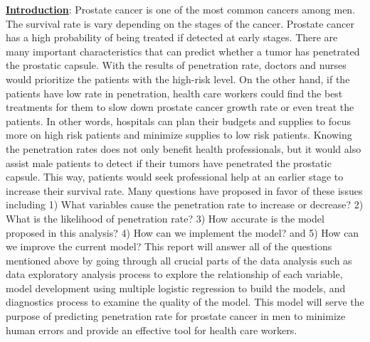 \documentclass[11pt]{article}\usepackage[]{graphicx}\usepackage[]{color}
\begin{document}
\noindent\textbf{\underline{Introduction}}: Prostate cancer is one of the most common cancers among men. The survival rate is vary depending on the stages of the cancer. Prostate cancer has a high probability of being treated if detected at early stages. There are many important characteristics that can predict whether a tumor has penetrated the prostatic capsule. With the results of penetration rate, doctors and nurses would prioritize the patients with the high-risk level. On the other hand, if the patients have low rate in penetration, health care workers could find the best treatments for them to slow down prostate cancer growth rate or even treat the patients. In other words, hospitals can plan their budgets and supplies to focus more on high risk patients and minimize supplies to low risk patients. Knowing the penetration rates does not only benefit health professionals, but it would also assist male patients to detect if their tumors have penetrated the prostatic capsule. This way, patients would seek professional help at an earlier stage to increase their survival rate. Many questions have proposed in favor of these issues including 1) What variables cause the penetration rate to increase or decrease? 2) What is the likelihood of penetration rate? 3) How accurate is the model proposed in this analysis? 4) How can we implement the model? and 5) How can we improve the current model? This report will answer all of the questions mentioned above by going through all crucial parts of the data analysis such as data exploratory analysis process to explore the relationship of each variable, model development using multiple logistic regression to build the models, and diagnostics process to examine the quality of the model. This model will serve the purpose of predicting penetration rate for prostate cancer in men to minimize human errors and provide an effective tool for health care workers.
\hfill \break
\end{document}
